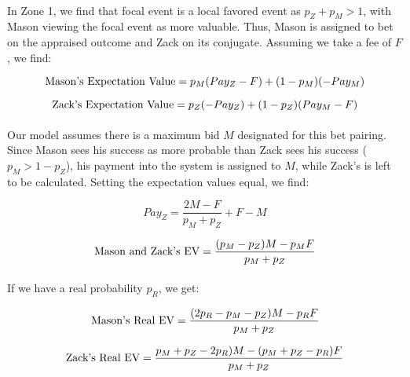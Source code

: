 \documentclass[12pt,letterpaper]{article}
\begin{document}
\paragraph{} In Zone 1, we find that focal event is a local favored event as $p_Z + p_M > 1$, with Mason viewing the focal event as more valuable. Thus, Mason is assigned to bet on the appraised outcome and Zack on its conjugate. Assuming we take a fee of $F$, we find:

\begin{equation}
\textnormal{Mason's Expectation Value} = p_M (Pay_Z - F) + (1 - p_M )(-Pay_M)
\end{equation}

\begin{equation}
\textnormal{Zack's Expectation Value} = p_Z (-Pay_Z) + (1 - p_Z )(Pay_M - F) 
\end{equation}

\paragraph{} Our model assumes there is a maximum bid $M$ designated for this bet pairing. Since Mason sees his success as more probable than Zack sees his success ($p_M > 1 - p_Z$), his payment into the system is assigned to $M$, while Zack’s is left to be calculated. Setting the expectation values equal, we find:

\begin{equation}
Pay_Z = \frac{2M - F}{p_M + p_Z} + F - M
\end{equation}

\begin{equation}
\textnormal{Mason and Zack's EV} = \frac{(p_M - p_Z)M - p_M F}{p_M + p_Z}
\end{equation}

\paragraph{} If we have a real probability $p_R$, we get:

\begin{equation}
\textnormal{Mason's Real EV} = \frac{(2p_R - p_M - p_Z)M - p_R F}{p_M + p_Z}
\end{equation}

\begin{equation}
\textnormal{Zack's Real EV} = \frac{p_M + p_Z - 2p_R)M - (p_M + p_Z - p_R)F}{p_M + p_Z}
\end{equation}
\end{document}
